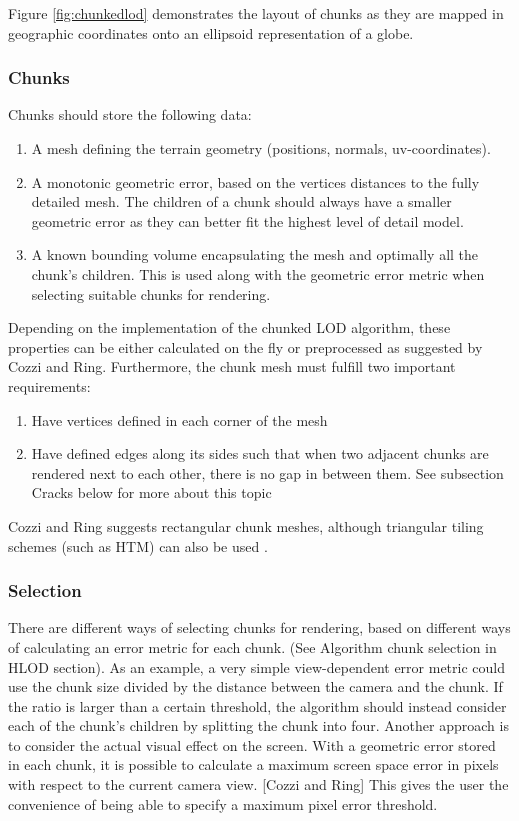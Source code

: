 Figure \ref{fig:chunkedlod} demonstrates the layout of chunks as they are mapped in geographic coordinates onto an ellipsoid representation of a globe.

\subsubsection{Chunks}
Chunks should store the following data:

\begin{enumerate}
    \item A mesh defining the terrain geometry (positions, normals, uv-coordinates). 
    \item A monotonic geometric error, based on the vertices distances to the fully detailed mesh. The children of a chunk should always have a smaller geometric error as they can better fit the highest level of detail model.
    \item A known bounding volume encapsulating the mesh and optimally all the chunk's children. This is used along with the geometric error metric when selecting suitable chunks for rendering.
\end{enumerate}

Depending on the implementation of the chunked LOD algorithm, these properties can be either calculated on the fly or preprocessed as suggested by Cozzi and Ring\cite[p. 447]{cozzi11}. Furthermore, the chunk mesh must fulfill two important requirements: 

\begin{enumerate}
    \item Have vertices defined in each corner of the mesh
    \item Have defined edges along its sides such that when two adjacent chunks are rendered next to each other, there is no gap in between them. See subsection Cracks below for more about this topic
\end{enumerate}

Cozzi and Ring suggests rectangular chunk meshes, although triangular tiling schemes (such as HTM) can also be used \cite{htm}.

\subsubsection{Selection}
There are different ways of selecting chunks for rendering, based on different ways of calculating an error metric for each chunk. (See Algorithm chunk selection in HLOD section). As an example, a very simple view-dependent error metric could use the chunk size divided by the distance between the camera and the chunk. If the ratio is larger than a certain threshold, the algorithm should instead consider each of the chunk's children by splitting the chunk into four. Another approach is to consider the actual visual effect on the screen. With a geometric error stored in each chunk, it is possible to calculate a maximum screen space error in pixels with respect to the current camera view. [Cozzi and Ring] This gives the user the convenience of being able to specify a maximum pixel error threshold.

